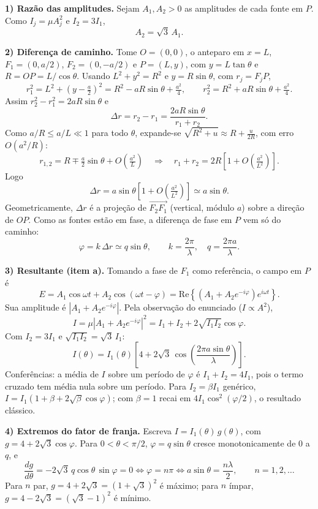 \documentclass{article}%
\begin{document}
\textbf{1) Razão das amplitudes.} Sejam $A_1,A_2>0$ as amplitudes de cada fonte em $P$. Como $I_j=\mu A_j^2$ e $I_2=3I_1$,
\[
A_2=\sqrt{3}\,A_1 .
\]

\textbf{2) Diferença de caminho.} Tome $O=(0,0)$, o anteparo em $x=L$, $F_1=(0,a/2)$, $F_2=(0,-a/2)$ e $P=(L,y)$, com $y=L\tan\theta$ e $R=OP=L/\cos\theta$. Usando $L^2+y^2=R^2$ e $y=R\sin\theta$, com $r_j=F_jP$,
\[
r_1^2=L^2+\left(y-\tfrac a2\right)^2=R^2-aR\sin\theta+\tfrac{a^2}{4},\qquad
r_2^2=R^2+aR\sin\theta+\tfrac{a^2}{4}.
\]
Assim $r_2^2-r_1^2=2aR\sin\theta$ e
\[
\Delta r=r_2-r_1=\frac{2aR\sin\theta}{r_1+r_2}.
\]
Como $a/R\le a/L\ll 1$ para todo $\theta$, expande-se $\sqrt{R^2+u}\approx R+\tfrac{u}{2R}$, com erro $O(a^2/R)$:
\[
r_{1,2}=R\mp\tfrac a2\sin\theta+O\!\left(\tfrac{a^2}{L}\right)
\quad\Rightarrow\quad
r_1+r_2=2R\left[1+O\!\left(\tfrac{a^2}{L^2}\right)\right].
\]
Logo
\[
\Delta r=a\sin\theta\left[1+O\!\left(\tfrac{a^2}{L^2}\right)\right]\simeq a\sin\theta .
\]
Geometricamente, $\Delta r$ é a projeção de $\overrightarrow{F_2F_1}$ (vertical, módulo $a$) sobre a direção de $OP$. Como as fontes estão em fase, a diferença de fase em $P$ vem só do caminho:
\[
\varphi=k\,\Delta r\simeq q\sin\theta,\qquad k=\frac{2\pi}{\lambda},\quad q=\frac{2\pi a}{\lambda}.
\]

\textbf{3) Resultante (item a).} Tomando a fase de $F_1$ como referência, o campo em $P$ é
\[
E=A_1\cos\omega t+A_2\cos(\omega t-\varphi)=\mathrm{Re}\left\{\left(A_1+A_2e^{-i\varphi}\right)e^{i\omega t}\right\}.
\]
Sua amplitude é $|A_1+A_2e^{-i\varphi}|$. Pela observação do enunciado ($I\propto A^2$),
\[
I=\mu\left|A_1+A_2e^{-i\varphi}\right|^2=I_1+I_2+2\sqrt{I_1I_2}\cos\varphi .
\]
Com $I_2=3I_1$ e $\sqrt{I_1I_2}=\sqrt{3}\,I_1$:
\[
I(\theta)=I_1(\theta)\left[4+2\sqrt{3}\,\cos\!\left(\frac{2\pi a\sin\theta}{\lambda}\right)\right].
\]
Conferências: a média de $I$ sobre um período de $\varphi$ é $I_1+I_2=4I_1$, pois o termo cruzado tem média nula sobre um período. Para $I_2=\beta I_1$ genérico, $I=I_1(1+\beta+2\sqrt{\beta}\cos\varphi)$; com $\beta=1$ recai em $4I_1\cos^2(\varphi/2)$, o resultado clássico.

\textbf{4) Extremos do fator de franja.} Escreva $I=I_1(\theta)\,g(\theta)$, com $g=4+2\sqrt{3}\cos\varphi$. Para $0<\theta<\pi/2$, $\varphi=q\sin\theta$ cresce monotonicamente de $0$ a $q$, e
\[
\frac{dg}{d\theta}=-2\sqrt{3}\,q\cos\theta\,\sin\varphi=0\iff\varphi=n\pi\iff a\sin\theta=\frac{n\lambda}{2},\qquad n=1,2,\dots
\]
Para $n$ par, $g=4+2\sqrt{3}=(1+\sqrt{3})^2$ é máximo; para $n$ ímpar, $g=4-2\sqrt{3}=(\sqrt{3}-1)^2$ é mínimo.
\end{document}
